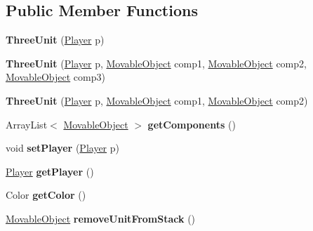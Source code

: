 \subsection*{Public Member Functions}
\begin{DoxyCompactItemize}
\item 
\hypertarget{classcharacters_1_1_three_unit_a0a59db758d4bdf864436911a7d3ef54b}{{\bfseries Three\-Unit} (\hyperlink{enumenums_1_1_player}{Player} p)}\label{classcharacters_1_1_three_unit_a0a59db758d4bdf864436911a7d3ef54b}

\item 
\hypertarget{classcharacters_1_1_three_unit_abe178138148db8a6cf7277d4ea5ef44f}{{\bfseries Three\-Unit} (\hyperlink{enumenums_1_1_player}{Player} p, \hyperlink{classbasecomponents_1_1_movable_object}{Movable\-Object} comp1, \hyperlink{classbasecomponents_1_1_movable_object}{Movable\-Object} comp2, \hyperlink{classbasecomponents_1_1_movable_object}{Movable\-Object} comp3)}\label{classcharacters_1_1_three_unit_abe178138148db8a6cf7277d4ea5ef44f}

\item 
\hypertarget{classcharacters_1_1_three_unit_adf387aeb5a33ebb2cd69410f32d9eefa}{{\bfseries Three\-Unit} (\hyperlink{enumenums_1_1_player}{Player} p, \hyperlink{classbasecomponents_1_1_movable_object}{Movable\-Object} comp1, \hyperlink{classbasecomponents_1_1_movable_object}{Movable\-Object} comp2)}\label{classcharacters_1_1_three_unit_adf387aeb5a33ebb2cd69410f32d9eefa}

\item 
\hypertarget{classcharacters_1_1_three_unit_abcb37f1c97d8e8e0680163784dc9173f}{Array\-List$<$ \hyperlink{classbasecomponents_1_1_movable_object}{Movable\-Object} $>$ {\bfseries get\-Components} ()}\label{classcharacters_1_1_three_unit_abcb37f1c97d8e8e0680163784dc9173f}

\item 
\hypertarget{classcharacters_1_1_three_unit_a3e17207381edb02d29716bd8b4cc6bb4}{void {\bfseries set\-Player} (\hyperlink{enumenums_1_1_player}{Player} p)}\label{classcharacters_1_1_three_unit_a3e17207381edb02d29716bd8b4cc6bb4}

\item 
\hypertarget{classcharacters_1_1_three_unit_a220b7b388a107285e728060bc0fb5f20}{\hyperlink{enumenums_1_1_player}{Player} {\bfseries get\-Player} ()}\label{classcharacters_1_1_three_unit_a220b7b388a107285e728060bc0fb5f20}

\item 
\hypertarget{classcharacters_1_1_three_unit_a8e8c39b20320c930a4c9d451ea9a1c78}{Color {\bfseries get\-Color} ()}\label{classcharacters_1_1_three_unit_a8e8c39b20320c930a4c9d451ea9a1c78}

\item 
\hypertarget{classcharacters_1_1_three_unit_ab8a6dfbbcf8a40fdb4932006dc3f3dc3}{\hyperlink{classbasecomponents_1_1_movable_object}{Movable\-Object} {\bfseries remove\-Unit\-From\-Stack} ()}\label{classcharacters_1_1_three_unit_ab8a6dfbbcf8a40fdb4932006dc3f3dc3}

\end{DoxyCompactItemize}
